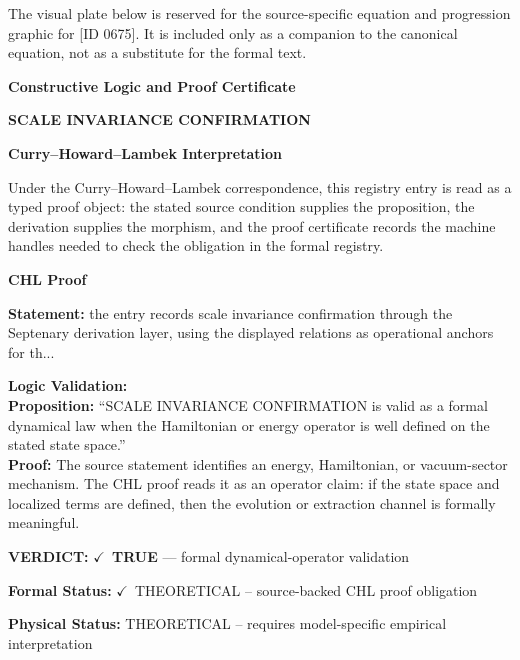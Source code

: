 \begingroup\footnotesize\sloppy
The visual plate below is reserved for the source-specific equation and progression graphic for [ID 0675]. It is included only as a companion to the canonical equation, not as a substitute for the formal text.
\par\endgroup
\ifTZPDarkEdition
{}
\fi

\clearpage
\begingroup\tzpsupportsetup
\noindent\textbf{\fontsize{10.8pt}{12.8pt}\selectfont [ID 0675] Constructive Logic and Proof Certificate}\par
\noindent\textbf{\fontsize{10pt}{12pt}\selectfont SCALE INVARIANCE CONFIRMATION}\par
\vspace{0.45em}
\begingroup
\footnotesize
\setlength{\parskip}{0.22em}
\setlength{\parindent}{0pt}
\noindent\textbf{Curry--Howard--Lambek Interpretation}\par
Under the Curry--Howard--Lambek correspondence, this registry entry is read as a typed proof
object: the stated source condition supplies the proposition, the derivation supplies the
morphism, and the proof certificate records the machine handles needed to check the obligation
in the formal registry.

\vspace{0.45em}
\noindent\textbf{CHL Proof}\par
\textbf{Statement:} the entry records scale invariance confirmation through the Septenary derivation layer,
using the displayed relations as operational anchors for th...

\textbf{Logic Validation:}\\
\textbf{Proposition:} ``SCALE INVARIANCE CONFIRMATION is valid as a formal dynamical law when the Hamiltonian or
energy operator is well defined on the stated state space.''\\
\textbf{Proof:} The source statement identifies an energy, Hamiltonian, or vacuum-sector mechanism. The
CHL proof reads it as an operator claim: if the state space and localized terms are
defined, then the evolution or extraction channel is formally meaningful.

\textbf{VERDICT:} \ensuremath{\checkmark}\ \textbf{TRUE} --- formal dynamical-operator validation

\textbf{Formal Status:} \ensuremath{\checkmark}\ THEORETICAL -- source-backed CHL proof obligation

\textbf{Physical Status:} THEORETICAL -- requires model-specific empirical interpretation
\par\vspace{0.45em}
\par
\ifTZPDarkEdition
{}
\fi
\endgroup
\endgroup
